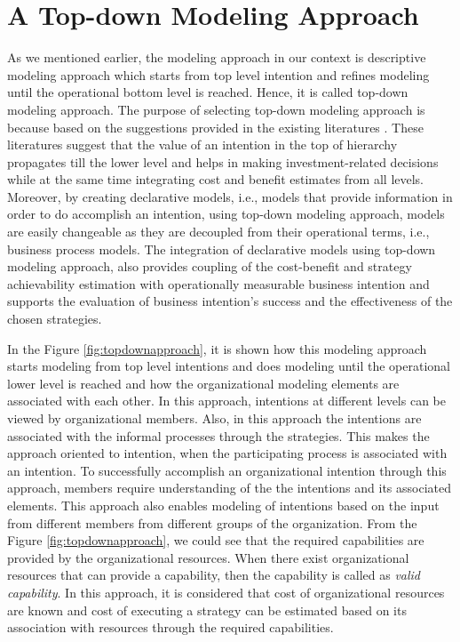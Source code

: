 \section{A Top-down Modeling Approach}
\label{sec:topdownapproach}
As we mentioned earlier, the modeling approach in our context is descriptive modeling approach which starts from top level intention and refines modeling until the operational bottom level is reached. Hence, it is called top-down modeling approach. The purpose of selecting top-down modeling approach is because based on the suggestions provided in the existing literatures \cite{Mandic2010, Bider2005,Sungur2016}. These literatures suggest that the value of an intention in the top of hierarchy propagates till the lower level and helps in making investment-related decisions while at the same time integrating cost and benefit estimates from all levels. Moreover, by creating declarative models, i.e., models that provide information in order to do accomplish an intention, using top-down modeling approach, models are easily changeable as they are decoupled from their operational terms, i.e., business process models. The integration of declarative models using top-down modeling approach, also provides coupling of the cost-benefit and strategy achievability estimation with operationally measurable business intention and supports the evaluation of business intention's success and the effectiveness of the chosen strategies. 

In the Figure \ref{fig:topdownapproach}, it is shown how this modeling approach starts modeling from top level intentions and does modeling until the operational lower level is reached and how the organizational modeling elements are associated with each other. In this approach, intentions at different levels can be viewed by organizational members. Also, in this approach the intentions are associated with the informal processes through the strategies. This makes the approach oriented to intention, when the participating process is associated with an intention. To successfully accomplish an organizational intention through this approach, members require understanding of the the intentions and its associated elements. This approach also enables modeling of intentions based on the input from different members from different groups of the organization. From the Figure \ref{fig:topdownapproach}, we could see that the required capabilities are provided by the organizational resources. When there exist organizational resources that can provide a capability, then the capability is called as \textit{valid capability}. In this approach, it is considered that cost of organizational resources are known and cost of executing a strategy can be estimated based on its association with resources through the required capabilities. 


